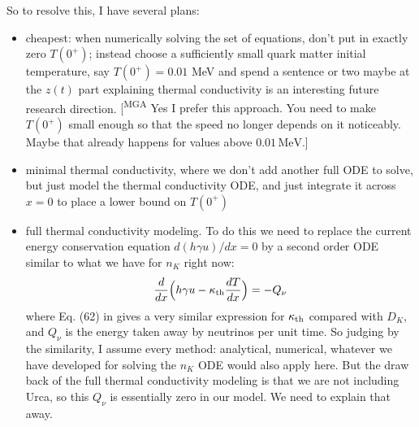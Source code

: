 \documentclass[10pt,superscriptaddress,
amsmath,aps,prc,twocolumn,nofootinbib,floatfix]{revtex4-1}
\newcommand{\mgacom}[1]{\textsf{\color[rgb]{0.8,0,0}[\textsuperscript{MGA} #1]}}
\newcommand{\JScom}[1]{\textsf{\color{violet} [\textsuperscript{JS}#1]}}
\newcommand{\MeV}{\text{MeV}}
\begin{document}
{So to resolve this, I have several plans:
\begin{itemize}
    \item cheapest: when numerically solving the set of equations, don't put in exactly zero $T(0^+)$; instead choose a sufficiently small quark matter initial temperature, say $T(0^+) = 0.01$ MeV and spend a sentence or two maybe at the $z(t)$ part explaining thermal conductivity is an interesting future research direction.
    \mgacom{Yes I prefer this approach. You need to make $T(0^+)$ small enough so that the speed no longer depends on it noticeably. Maybe that already happens for values above $0.01\,\MeV$.}
    \item minimal thermal conductivity, where we don't add another full ODE to solve, but just model the thermal conductivity ODE, and just integrate it across $x=0$ to place a lower bound on $T(0^+)$
    \item full thermal conductivity modeling. To do this we need to replace the current energy conservation equation $d(h\gamma u)/dx = 0$ by a second order ODE similar to what we have for $n_K$ right now:
\[
\frac{d}{dx}\Big(h\gamma u - \kappa_{\rm th}\frac{dT}{dx}\Big) = -Q_\nu
\]
where Eq. (62) in \cite{Heiselberg:1993cr} gives a very similar expression for $\kappa_{\rm th}$ compared with $D_K$, and $Q_\nu$ is the energy taken away by neutrinos per unit time. So judging by the similarity, I assume every method: analytical, numerical, whatever we have developed for solving the $n_K$ ODE would also apply here. But the draw back of the full thermal conductivity modeling is that we are not including Urca, so this $Q_\nu$ is essentially zero in our model. We need to explain that away. 
\end{itemize}

}



\end{document}
